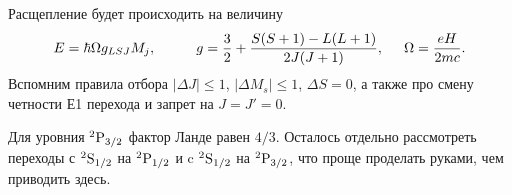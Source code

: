 
Расщепление будет происходить на величину
\begin{equation*}
	E = \hbar \Omega g_{LSJ} M_j,
	\hspace{10 mm} 
	g = \frac{3}{2} + \frac{S(S+1) - L(L+1)}{2 J(J+1)},
	\hspace{5 mm} 
	\Omega = \frac{e H}{2 m c}.
\end{equation*}
Вспомним правила отбора $|\Delta J| \leq 1$, $|\Delta M_s | \leq 1$, $\Delta S = 0$, а также про смену четности Е1 перехода и запрет на $J=J'=0$. 

Для уровния ${}^{2}\textnormal{P}_{3/2}$ фактор Ланде равен $4/3$. Осталось отдельно рассмотреть переходы с ${}^{2}\textnormal{S}_{1/2}$ на ${}^{2}\textnormal{P}_{1/2}$ и c ${}^{2}\textnormal{S}_{1/2}$ на ${}^{2}\textnormal{P}_{3/2}$, что проще проделать руками, чем приводить здесь.